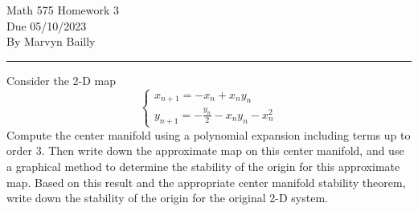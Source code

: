 \documentclass[12pt]{report}
\begin{document}
\large

\begin{center}
 Math 575 Homework 3\\
 Due 05/10/2023\\
 By Marvyn Bailly\\
\end{center}

\normalsize

\hrule



\begin{problem}
    Consider the 2-D map
    \begin{equation*}
        \left\{\begin{array}{l}
        x_{n+1} = -x_n + x_n y_n \\
        y_{n+1} = - \frac{y_n}{2} - x_n y_n - x_n^2  
        \end{array}\right.
    \end{equation*}
    Compute the center manifold using a polynomial expansion including terms up to order 3.  Then write down the approximate map on this center manifold, and use a graphical method to determine the stability of the origin for this approximate map.  Based on this result and the appropriate center manifold stability theorem, write down the stability of the origin for the original 2-D system.
\end{problem}
\end{document}
